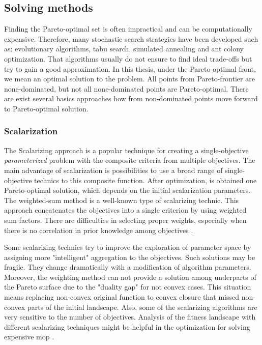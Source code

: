         \subsection{Solving methods}
            Finding the Pareto-optimal set is often impractical and can be computationally expensive. Therefore, many stochastic search strategies have been developed such as: evolutionary algorithms, tabu search, simulated annealing and ant colony optimization. That algorithms usually do not ensure to find ideal trade-offs but try to gain a good approximation.
            In this thesis, under the Pareto-optimal front, we mean an optimal solution to the problem. All points from Pareto-frontier are none-dominated, but not all none-dominated points are Pareto-optimal. There are exist several basics approaches how from non-dominated points move forward to Pareto-optimal solution.
        
            \subsubsection{Scalarization}
                The Scalarizing approach is a popular technique for creating a single-objective \textit{parameterized} problem with the composite criteria from multiple objectives. The main advantage of scalarization is possibilities to use a broad range of single-objective technics to this composite function. After optimization,  is obtained one Pareto-optimal solution, which depends on the initial scalarization parameters. The weighted-sum method is a well-known type of scalarizing technic. This approach concatenates the objectives into a single criterion by using weighted sum factors. There are difficulties in selecting proper weights, especially when there is no correlation in prior knowledge among objectives \cite{ChughScal2019, DerbelBLV14}. 

                Some scalarizing technics try to improve the exploration of parameter space by assigning more "intelligent" aggregation to the objectives. Such solutions may be fragile. They change dramatically with a modification of algorithm parameters. Moreover, the weighting method can not provide a solution among underparts of the Pareto surface due to the "duality gap" for not convex cases. This situation means replacing non-convex original function to convex closure that missed non-convex parts of the initial landscape. Also, some of the scalarizing algorithms are very sensitive to the number of objectives. Analysis of the fitness landscape with different scalarizing techniques might be helpful in the optimization for solving expensive \gls{mop} \cite{ChughScal2019}.

